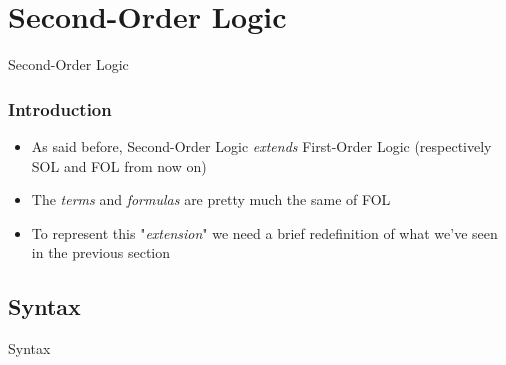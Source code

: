 \documentclass{beamer}
\begin{document}
        \section{Second-Order Logic}
            \begin{frame}
                \begin{center}
                    \begin{Huge}
                        \textcolor{title_blue}{Second-Order Logic}
                    \end{Huge}
                \end{center}
            \end{frame}

            \begin{frame}
                \frametitle{Introduction}
                \begin{itemize}
                    \item As said before, Second-Order Logic \textit{extends} First-Order Logic (respectively SOL and FOL from now on)
                    \item The \textit{terms} and \textit{formulas} are pretty much the same of FOL
                    \item To represent this "\textit{extension}" we need a brief redefinition of what we've seen in the previous section
                \end{itemize}
            \end{frame}

            \subsection{Syntax}
                \begin{frame}
                    \begin{center}
                        \begin{Huge}
                            \textcolor{title_blue}{Syntax}
                        \end{Huge}
                    \end{center}
                \end{frame}
\end{document}
